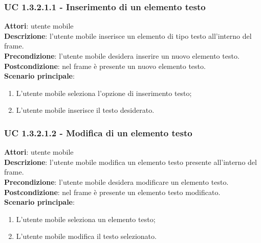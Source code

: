 \subsubsection{UC 1.3.2.1.1 - Inserimento di un elemento testo}{
	\label{uc1.3.2.1.1}
	\textbf{Attori}: utente mobile \\
	\textbf{Descrizione}: l'utente mobile inserisce un elemento di tipo testo all'interno del frame. \\
	\textbf{Precondizione}: l'utente mobile desidera inserire un nuovo elemento testo.	\\
	\textbf{Postcondizione}: nel frame è presente un nuovo elemento testo.	\\
	\textbf{Scenario principale}:
	\begin{enumerate}
		\item L'utente mobile seleziona l'opzione di inserimento testo;
		\item L'utente mobile inserisce il testo desiderato.
	\end{enumerate}
	}
\subsubsection{UC 1.3.2.1.2 - Modifica di un elemento testo}{
	\label{uc1.3.2.1.2}
	\textbf{Attori}: utente mobile \\
	\textbf{Descrizione}: l'utente mobile modifica un elemento testo presente all'interno del frame. \\
	\textbf{Precondizione}: l'utente mobile desidera modificare un elemento testo.	\\
	\textbf{Postcondizione}: nel frame è presente un elemento testo modificato.	\\
	\textbf{Scenario principale}:
	\begin{enumerate}
		\item L'utente mobile seleziona un elemento testo;
		\item L'utente mobile modifica il testo selezionato.
	\end{enumerate}
	}	
